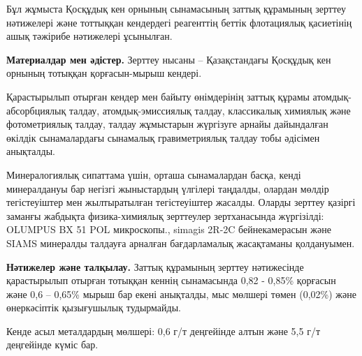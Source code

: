 \begin{multicols}{2}
Бұл жұмыста Қосқұдық кен орнының сынамасының заттық құрамының зерттеу
нәтижелері және тоттыққан кендердегі реагенттің беттік флотациялық
қасиетінің ашық тәжірибе нәтижелері ұсынылған.

{\bfseries Материалдар мен әдістер.} Зерттеу нысаны -- Қазақстандағы
Қосқұдық кен орнының тотыққан қорғасын-мырыш кендері.

Қарастырылып отырған кендер мен байыту өнімдерінің заттық құрамы
атомдық-абсорбциялық талдау, атомдық-эмиссиялық талдау, классикалық
химиялық және фотометриялық талдау, талдау жұмыстарын жүргізуге арнайы
дайындалған өкілдік сынамалардағы сынамалық гравиметриялық талдау тобы
әдісімен анықталды.

Минералогиялық сипаттама үшін, орташа сынамалардан басқа, кенді
минералдануы бар негізгі жыныстардың үлгілері таңдалды, олардан мөлдір
тегістеуіштер мен жылтыратылған тегістеуіштер жасалды. Оларды зерттеу
қазіргі заманғы жабдықта физика-химиялық зерттеулер зертханасында
жүргізілді: OLUMPUS BX 51 POL микроскопы., simagis 2R-2C бейнекамерасын
және SIAMS минералды талдауға арналған бағдарламалық жасақтаманы
қолдануымен.

{\bfseries Нәтижелер және талқылау.} Заттық құрамының зерттеу нәтижесінде
қарастырылып отырған тотыққан кеннің сынамасында 0,82 - 0,85\% қорғасын
және 0,6 -- 0,65\% мырыш бар екені анықталды, мыс мөлшері төмен (0,02\%)
және өнеркәсіптік қызығушылық тудырмайды.

Кенде асыл металдардың мөлшері: 0,6 г/т деңгейінде алтын және 5,5 г/т
деңгейінде күміс бар.
\end{multicols}

